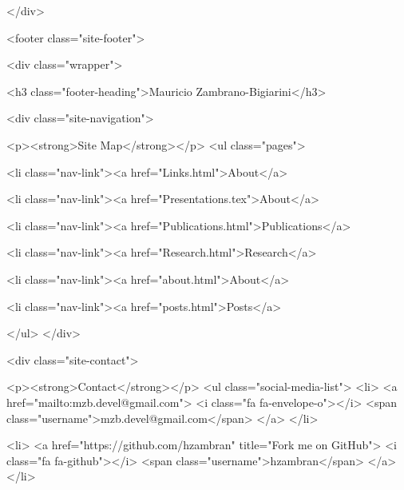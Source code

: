     </div>

    <footer class="site-footer">

  <div class="wrapper">

    <h3 class="footer-heading">Mauricio Zambrano-Bigiarini</h3>

    <div class="site-navigation">
    	
    	<p><strong>Site Map</strong></p>
      <ul class="pages">
        
        
          <li class="nav-link"><a href="Links.html">About</a>
        
        
        
          <li class="nav-link"><a href="Presentations.tex">About</a>
        
        
        
          <li class="nav-link"><a href="Publications.html">Publications</a>
        
        
        
          <li class="nav-link"><a href="Research.html">Research</a>
        
        
        
          <li class="nav-link"><a href="about.html">About</a>
        
        
        
        
        
        
        
        
        
          <li class="nav-link"><a href="posts.html">Posts</a>
        
        
        
        
      </ul>
    </div>

    <div class="site-contact">

    	<p><strong>Contact</strong></p>
      <ul class="social-media-list">
      	<li>
      		<a href="mailto:mzb.devel@gmail.com">
	      		<i class="fa fa-envelope-o"></i>
	      		<span class="username">mzb.devel@gmail.com</span>
      		</a>
      	</li>

      	
	      	
      	
	      	
      	
	      	
	      	<li>
	          <a href="https://github.com/hzambran" title="Fork me on GitHub">
	            <i class="fa fa-github"></i>
	            <span class="username">hzambran</span>
	          </a>
	        </li>
	      	
      	
	      	

